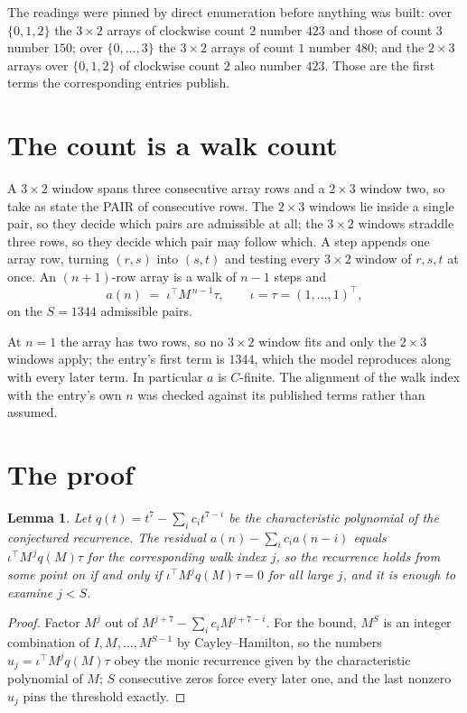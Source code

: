 \documentclass[11pt,a4paper]{article}
\theoremstyle{plain}
\newtheorem{lemma}[theorem]{Lemma}
\theoremstyle{definition}
\begin{document}
The readings were pinned by direct enumeration before anything was built: over
$\{0,1,2\}$ the $3\times2$ arrays of clockwise count $2$ number $423$ and those of count
$3$ number $150$; over $\{0,\dots,3\}$ the $3\times2$ arrays of count $1$ number $480$;
and the $2\times3$ arrays over $\{0,1,2\}$ of clockwise count $2$ also number $423$. Those
are the first terms the corresponding entries publish.

\section{The count is a walk count}

A $3\times2$ window spans three consecutive array rows and a $2\times3$
window two, so take as state the PAIR of consecutive rows. The $2\times3$ windows lie inside a
single pair, so they decide which pairs are admissible at all; the $3\times2$ windows straddle
three rows, so they decide which pair may follow which. A step appends one array row, turning
$(r,s)$ into $(s,t)$ and testing every $3\times2$ window of $r,s,t$ at once. An $(n+1)$-row
array is a walk of $n-1$ steps and
\[
a(n)\;=\;\iota^{\!\top}M^{\,n-1}\tau,\qquad\iota=\tau=(1,\dots,1)^{\!\top},
\]
on the $S=1344$ admissible pairs.

At $n=1$ the array has two rows, so no $3\times2$ window fits and only the
$2\times3$ windows apply; the entry's first term is
$1344$, which the model reproduces along with every later term.
In particular $a$ is $C$-finite. The alignment of the walk index with the entry's own $n$ was
checked against its published terms rather than assumed.

\section{The proof}

\begin{lemma}\label{lem:crit}
Let $q(t)=t^{7}-\sum_i c_it^{7-i}$ be the characteristic polynomial of the
conjectured recurrence. The residual $a(n)-\sum_ic_ia(n-i)$ equals
$\iota^{\!\top}M^{\,j}q(M)\tau$ for the corresponding walk index $j$, so the recurrence
holds from some point on if and only if $\iota^{\!\top}M^{j}q(M)\tau=0$ for all large $j$,
and it is enough to examine $j<S$.
\end{lemma}

\begin{proof}
Factor $M^{j}$ out of $M^{j+7}-\sum_ic_iM^{j+7-i}$. For the bound, $M^{S}$
is an integer combination of $I,M,\dots,M^{S-1}$ by Cayley--Hamilton, so the numbers
$u_j=\iota^{\!\top}M^{j}q(M)\tau$ obey the monic recurrence given by the characteristic
polynomial of $M$; $S$ consecutive zeros force every later one, and the last nonzero $u_j$
pins the threshold exactly.
\end{proof}
\end{document}
